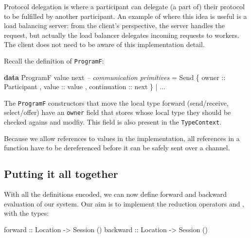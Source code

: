 \documentclass[runningheads,plain]{llncs}
\newenvironment{Shaded}{}{}
\newcommand{\KeywordTok}[1]{\textcolor[rgb]{0.00,0.44,0.13}{\textbf{#1}}}
\newcommand{\DataTypeTok}[1]{\textcolor[rgb]{0.56,0.13,0.00}{#1}}
\newcommand{\CommentTok}[1]{\textcolor[rgb]{0.38,0.63,0.69}{\textit{#1}}}
\newcommand{\OtherTok}[1]{\textcolor[rgb]{0.00,0.44,0.13}{#1}}
\newcommand{\FunctionTok}[1]{\textcolor[rgb]{0.02,0.16,0.49}{#1}}
\newcommand{\NormalTok}[1]{#1}
\begin{document}
Protocol delegation is where a participant can delegate (a part of)
their protocol to be fulfilled by another participant. An example of
where this idea is useful is a load balancing server: from the client's
perspective, the server handles the request, but actually the load
balancer delegates incoming requests to workers. The client does not
need to be aware of this implementation detail.

Recall the definition of \texttt{ProgramF}:

\begin{Shaded}
\begin{Highlighting}[]
\KeywordTok{data} \DataTypeTok{ProgramF}\NormalTok{ value next }
    \CommentTok{-- communication primitives}
    \FunctionTok{=} \DataTypeTok{Send} 
\NormalTok{        \{}\OtherTok{ owner ::} \DataTypeTok{Participant}
\NormalTok{        ,}\OtherTok{ value ::}\NormalTok{ value}
\NormalTok{        ,}\OtherTok{ continuation ::}\NormalTok{ next }
\NormalTok{        \}}
    \FunctionTok{|} \FunctionTok{...} 
\end{Highlighting}
\end{Shaded}

The \texttt{ProgramF} constructors that move the local type forward
(send/receive, select/offer) have an \texttt{owner} field that stores
whose local type they should be checked agains and modfiy. This field is
also present in the \texttt{TypeContext}.

Because we allow references to values in the implementation, all
references in a function have to be dereferenced before it can be safely
sent over a channel.


\subsection{Putting it all together}\label{combining}

With all the definitions encoded, we can now define forward and backward
evaluation of our system. Our aim is to implement the reduction operators \fw and \bk, with the types:

\begin{Shaded}
\begin{Highlighting}[]
\OtherTok{forward  ::} \DataTypeTok{Location} \OtherTok{->} \DataTypeTok{Session}\NormalTok{ ()}
\OtherTok{backward ::} \DataTypeTok{Location} \OtherTok{->} \DataTypeTok{Session}\NormalTok{ ()}
\end{Highlighting}
\end{Shaded}
\end{document}
